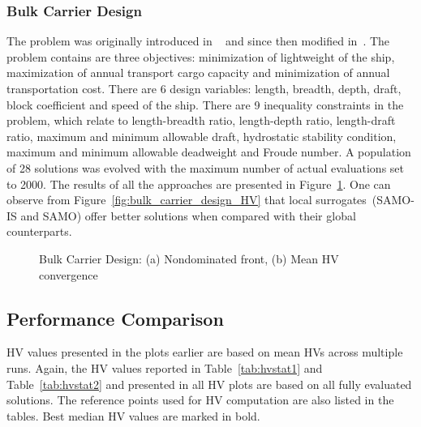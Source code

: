 \subsubsection{Bulk Carrier Design} The problem was originally introduced in ~\cite{sen1998mcd} and
since then modified in~\cite{augusto2012new}. The problem contains are three objectives:
minimization of lightweight of the ship, maximization of annual transport cargo capacity and
minimization of annual transportation cost. There are 6 design variables: length, breadth, depth,
draft, block coefficient and speed of the ship. There are 9 inequality constraints in the problem,
which relate to length-breadth ratio, length-depth ratio, length-draft ratio, maximum and minimum
allowable draft, hydrostatic stability condition, maximum and minimum allowable deadweight and
Froude number. A population of 28 solutions was evolved with the maximum number of actual
evaluations set to 2000. The results of all the approaches are presented in
Figure~\ref{fig:bulk_carrier_design_Pareto}. One can observe from
Figure~\ref{fig:bulk_carrier_design_HV} that local surrogates~(SAMO-IS and SAMO) offer better
solutions when compared with their global counterparts.

\begin{figure}[!htb] \centering
	\caption{Bulk Carrier Design: (a) Nondominated front, (b) Mean HV convergence}
	\label{fig:bulk_carrier_design_Pareto} \end{figure}

\subsection{Performance Comparison} HV values presented in the plots earlier are based on mean HVs
across multiple runs. Again, the HV values reported in Table~\ref{tab:hvstat1} and
Table~\ref{tab:hvstat2} and presented in all HV plots are based on all fully evaluated solutions.
The reference points used for HV computation are also listed in the tables. Best median HV values are marked in bold.

